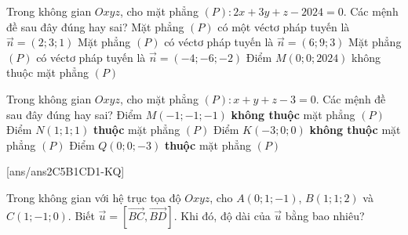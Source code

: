 \begin{ex}%
	Trong không gian $O x y z$, cho mặt phẳng $(P)\colon 2 x+3 y+z-2024=0$. Các mệnh đề sau đây đúng hay sai?
	\choiceTF
	{\True Mặt phẳng $(P)$ có một véctơ pháp tuyến là $\overrightarrow{n}=(2; 3; 1)$}
	{\True Mặt phẳng $(P)$ có véctơ pháp tuyến là $\overrightarrow{n}=(6; 9; 3)$}
	{\True Mặt phẳng $(P)$ có véctơ pháp tuyến là $\overrightarrow{n}=(-4;-6;-2)$}
	{Điểm $M(0; 0; 2024)$ không thuộc mặt phẳng $(P)$}
\end{ex}
\begin{ex}%
	Trong không gian $O x y z$, cho mặt phẳng $(P)\colon x+y+z-3=0$. Các mệnh đề sau đây đúng hay sai?
	\choiceTF
	{\True Điểm $M(-1;-1;-1)$ \textbf{không thuộc} mặt phẳng $(P)$}
	{\True Điểm $N(1; 1; 1)$ \textbf{thuộc} mặt phẳng $(P)$}
	{\True Điểm $K(-3; 0; 0)$ \textbf{không thuộc} mặt phẳng $(P)$}
	{Điểm $Q(0; 0;-3)$ \textbf{thuộc} mặt phẳng $(P)$}
\end{ex}
\TNSA
{}[ans/ans2C5B1CD1-KQ]
\begin{ex}%
	Trong không gian với hệ trục tọa độ $O x y z$, cho $A(0; 1;-1)$, $B(1; 1; 2)$ và $C(1;-1; 0)$. Biết  $\vec{u}=\left[\overrightarrow{B C}, \overrightarrow{B D}\right]$. Khi đó, độ dài của $\vec{u}$ bằng bao nhiêu?
\end{ex}

